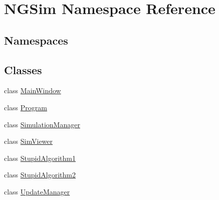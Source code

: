 \hypertarget{namespace_n_g_sim}{}\section{N\+G\+Sim Namespace Reference}
\label{namespace_n_g_sim}
\subsection*{Namespaces}
\begin{DoxyCompactItemize}
\end{DoxyCompactItemize}
\subsection*{Classes}
\begin{DoxyCompactItemize}
\item 
class \hyperlink{class_n_g_sim_1_1_main_window}{Main\+Window}
\item 
class \hyperlink{class_n_g_sim_1_1_program}{Program}
\item 
class \hyperlink{class_n_g_sim_1_1_simulation_manager}{Simulation\+Manager}
\item 
class \hyperlink{class_n_g_sim_1_1_sim_viewer}{Sim\+Viewer}
\item 
class \hyperlink{class_n_g_sim_1_1_stupid_algorithm1}{Stupid\+Algorithm1}
\item 
class \hyperlink{class_n_g_sim_1_1_stupid_algorithm2}{Stupid\+Algorithm2}
\item 
class \hyperlink{class_n_g_sim_1_1_update_manager}{Update\+Manager}
\end{DoxyCompactItemize}
